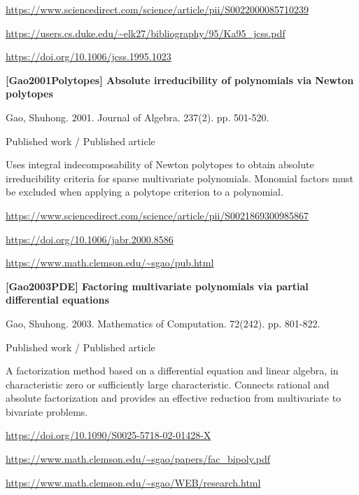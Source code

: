 \documentclass[11pt,a4paper,oneside,openany]{book}
\begin{document}
{\footnotesize\url{https://www.sciencedirect.com/science/article/pii/S0022000085710239}}\par
{\footnotesize\url{https://users.cs.duke.edu/~elk27/bibliography/95/Ka95_jcss.pdf}}\par
{\footnotesize\url{https://doi.org/10.1006/jcss.1995.1023}}\par
\vspace{9pt}
\hypertarget{ref:Gao2001Polytopes}{}
{\sffamily\bfseries\color{atlasgreen}[Gao2001Polytopes] Absolute irreducibility of polynomials via Newton polytopes}\par
\color{black} Gao, Shuhong. 2001. Journal of Algebra. 237(2). pp. 501-520.\par
{\small\sffamily\color{atlasgold}Published work / Published article}\par
\color{black} Uses integral indecomposability of Newton polytopes to obtain absolute irreducibility criteria for sparse multivariate polynomials. Monomial factors must be excluded when applying a polytope criterion to a polynomial.\par
{\footnotesize\url{https://www.sciencedirect.com/science/article/pii/S0021869300985867}}\par
{\footnotesize\url{https://doi.org/10.1006/jabr.2000.8586}}\par
{\footnotesize\url{https://www.math.clemson.edu/~sgao/pub.html}}\par
\vspace{9pt}
\hypertarget{ref:Gao2003PDE}{}
{\sffamily\bfseries\color{atlasgreen}[Gao2003PDE] Factoring multivariate polynomials via partial differential equations}\par
\color{black} Gao, Shuhong. 2003. Mathematics of Computation. 72(242). pp. 801-822.\par
{\small\sffamily\color{atlasgold}Published work / Published article}\par
\color{black} A factorization method based on a differential equation and linear algebra, in characteristic zero or sufficiently large characteristic. Connects rational and absolute factorization and provides an effective reduction from multivariate to bivariate problems.\par
{\footnotesize\url{https://doi.org/10.1090/S0025-5718-02-01428-X}}\par
{\footnotesize\url{https://www.math.clemson.edu/~sgao/papers/fac_bipoly.pdf}}\par
{\footnotesize\url{https://www.math.clemson.edu/~sgao/WEB/research.html}}\par
\end{document}
